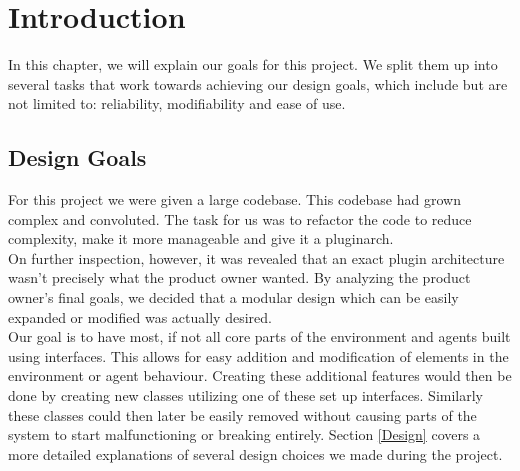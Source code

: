 \chapter{Introduction}

In this chapter, we will explain our goals for this project.
We split them up into several tasks that work towards achieving our design
goals, which include but are not limited to: reliability, modifiability and
ease of use.

\section{Design Goals}
For this project we were given a large codebase. This codebase had grown
complex and convoluted. The task for us was to refactor the code to reduce
complexity, make it more manageable and give it a \gls{pluginarch}. \\ On
further inspection, however, it was revealed that an exact plugin architecture
wasn't precisely what the product owner wanted. By analyzing the product
owner's final goals, we decided that a modular design which can be easily
expanded or modified was actually desired. \\ 
Our goal is to have most, if not all core parts of the environment and agents
built using interfaces. This allows for easy addition and modification of
elements in the environment or agent behaviour. Creating these additional
features would then be done by creating new classes utilizing one of these set
up interfaces. Similarly these classes could then later be easily removed
without causing parts of the system to start malfunctioning or breaking
entirely. Section \ref{Design} covers a more detailed explanations of several design choices we made during the project.\\

